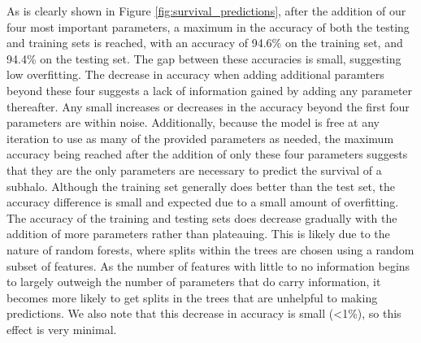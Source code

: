 \documentclass[fleqn,usenatbib]{mnras}
\begin{document}
As is clearly shown in Figure \ref{fig:survival_predictions}, after the addition of our four most important parameters, a maximum in the accuracy of both the testing and training sets is reached, with an accuracy of 94.6\% on the training set, and 94.4\% on the testing set. The gap between these accuracies is small, suggesting low overfitting. The decrease in accuracy when adding additional paramters beyond these four suggests a lack of information gained by adding any parameter thereafter. Any small increases or decreases in the accuracy beyond the first four parameters are within noise. Additionally, because the model is free at any iteration to use as many of the provided parameters as needed, the maximum accuracy being reached after the addition of only these four parameters suggests that they are the only parameters are necessary to predict the survival of a subhalo. Although the training set generally does better than the test set, the accuracy difference is small and expected due to a small amount of overfitting. The accuracy of the training and testing sets does decrease gradually with the addition of more parameters rather than plateauing. This is likely due to the nature of random forests, where splits within the trees are chosen using a random subset of features. As the number of features with little to no information begins to largely outweigh the number of parameters that do carry information, it becomes more likely to get splits in the trees that are unhelpful to making predictions. We also note that this decrease in accuracy is small (<1\%), so this effect is very minimal.
\end{document}
